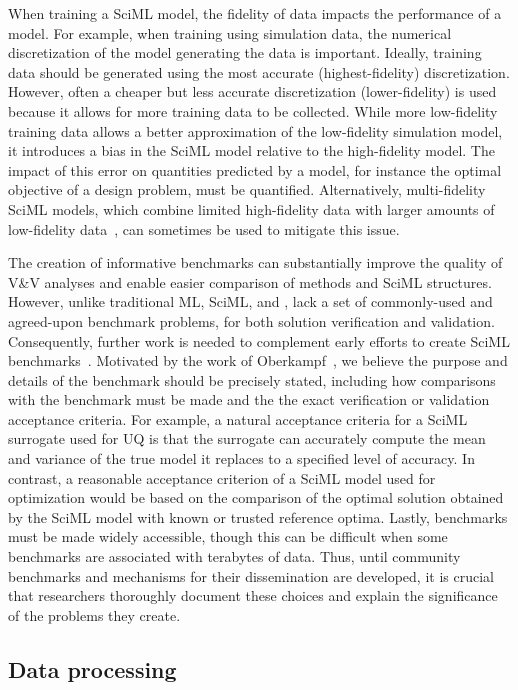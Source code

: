 When training a SciML model, the fidelity of data impacts the performance of a model. For example, when training using simulation data, the numerical discretization of the model generating the data is important. Ideally, training data should be generated using the most accurate (highest-fidelity) discretization. However, often a cheaper but less accurate discretization (lower-fidelity) is used because it allows for more training data to be collected. While more low-fidelity training data allows a better approximation of the low-fidelity simulation model, it introduces a bias in the SciML model relative to the high-fidelity model. The impact of this error on quantities predicted by a model, for instance the optimal objective of a design problem, must be quantified. Alternatively, multi-fidelity SciML models, which combine limited high-fidelity data with larger amounts of low-fidelity data~\cite{Gorodetsky_JG_CM_2021, Meng_K_JCP_2020, Cutajar_PDLG_Arxiv_2019}, can sometimes be used to mitigate this issue.


The creation of informative benchmarks can substantially improve the quality of V\&V analyses and enable easier comparison of methods and SciML structures. However, unlike traditional ML, SciML, and \CSE, lack a set of commonly-used and agreed-upon benchmark problems, for both solution verification and validation. 
Consequently, further work is needed to complement early efforts to create SciML benchmarks~\cite{Takamoto_PLMAPN_NIPS_2022}. Motivated by the work of Oberkampf~\cite{Oberkampf_TH_2004}, we believe the purpose and details of the benchmark should be precisely stated, including how comparisons with the benchmark must be made and the the exact verification or validation acceptance criteria. 
For example, a natural acceptance criteria for a SciML surrogate used for UQ is that the surrogate can accurately compute the mean and variance of the true model it replaces to a specified level of accuracy. In contrast, a reasonable acceptance criterion of a SciML model used for optimization would be based on the comparison of the optimal solution obtained by the SciML model with known or trusted reference optima. Lastly, benchmarks must be made widely accessible, though this can be difficult when some benchmarks are associated with terabytes of data.
Thus, until community benchmarks and mechanisms for their dissemination are developed, it is crucial that researchers thoroughly document these choices and explain the significance of the problems they create. 

\subsection{Data processing}

